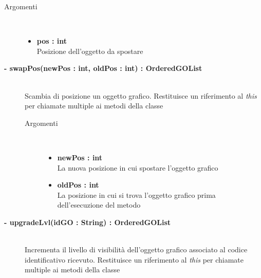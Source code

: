 \begin{description}
\begin{description}
		\begin{description}
			\item[Argomenti] \hfill \\
				\begin{itemize}
				
					\item \textbf{pos : int			} \hfill \\
					Posizione dell'oggetto da spostare
					
				\end{itemize}
		\end{description}
	\end{description}
	
	\begin{description}
		\item[\textbf{\color{blue}- swapPos(newPos : int, oldPos : int) : OrderedGOList			}] \hfill \\
			Scambia di posizione un oggetto grafico. Restituisce un riferimento al \textit{this} per chiamate multiple ai metodi della classe
			
		\begin{description}
			\item[Argomenti] \hfill \\
				\begin{itemize}
				
					\item \textbf{newPos : int			} \hfill \\
					La nuova posizione in cui spostare l'oggetto grafico
					\item \textbf{oldPos : int			} \hfill \\
					La posizione in cui si trova l'oggetto grafico prima dell'esecuzione del metodo
					
				\end{itemize}
		\end{description}
	\end{description}
	
	\begin{description}
		\item[\textbf{\color{blue}- upgradeLvl(idGO : String) : OrderedGOList			}] \hfill \\
			Incrementa il livello di visibilità dell'oggetto grafico associato al codice identificativo ricevuto. Restituisce un riferimento al \textit{this} per chiamate multiple ai metodi della classe
			

\end{description}
\end{description}
